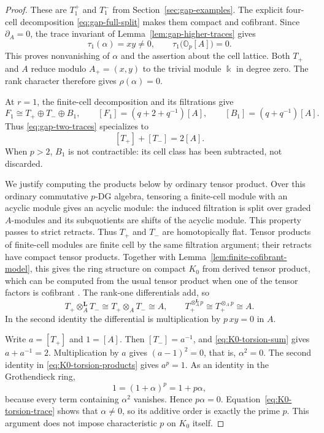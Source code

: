 \documentclass[11pt]{article}
\theoremstyle{definition}
\numberwithin{equation}{section}
\newcommand{\kk}{\Bbbk}
\begin{document}
\begin{proof}
These are $T_1^+$ and $T_1^-$ from
Section~\ref{sec:gap-examples}.  The explicit four-cell decomposition
\eqref{eq:gap-full-split} makes them compact and cofibrant.  Since
$\partial_A=0$, the trace invariant of
Lemma~\ref{lem:gap-higher-traces} gives
\begin{equation}\label{eq:K0-torsion-trace}
 \tau_1(\alpha)=xy\ne0,\qquad
 \tau_1\bigl(\mathbb O_p[A]\bigr)=0.
\end{equation}
This proves nonvanishing of $\alpha$ and the assertion about the cell
lattice.  Both $T_+$ and $A$ reduce modulo
$A_+=(x,y)$ to the trivial module $\kk$ in degree zero.
The rank character therefore gives $\rho(\alpha)=0$.

At $r=1$, the finite-cell decomposition and its filtrations give
\[
 F_1\cong T_+\oplus T_-\oplus B_1,\qquad
 [F_1]=(q+2+q^{-1})[A],\qquad [B_1]=(q+q^{-1})[A].
\]
Thus \eqref{eq:gap-two-traces} specializes to
\begin{equation}\label{eq:K0-torsion-sum}
 [T_+]+[T_-]=2[A].
\end{equation}
When $p>2$, $B_1$ is not contractible: its cell class has been
subtracted, not discarded.

We justify computing the products below by ordinary tensor product.
Over this ordinary commutative $p$-DG algebra, tensoring a finite-cell
module with an acyclic module gives an acyclic module: the induced
filtration is split over graded $A$-modules and its subquotients are
shifts of the acyclic module.  This property passes to strict
retracts.  Thus $T_+$ and $T_-$ are homotopically flat.
Tensor products of finite-cell modules are finite cell by the same
filtration argument; their retracts have compact tensor products.
Together with Lemma~\ref{lem:finite-cofibrant-model}, this gives the
ring structure on compact $K_0$ from derived tensor product, which can be 
computed from the usual tensor product when one of the tensor factors is cofibrant
\cite[Section~8.2]{QYHopf}. 
The rank-one differentials add, so
\begin{equation}\label{eq:K0-torsion-products}
 T_+\otimes_A^{\mathbf L}T_-\cong T_+\otimes_AT_-\cong A,\qquad
 T_+^{\otimes_A^{\mathbf L}p}\cong  T_+^{\otimes_Ap}\cong A.
\end{equation}
In the second identity the differential is multiplication by
$p\,xy=0$ in $A$.

Write $a=[T_+]$ and $1=[A]$.  Then $[T_-]=a^{-1}$, and
\eqref{eq:K0-torsion-sum} gives $a+a^{-1}=2$.
Multiplication by $a$ gives $(a-1)^2=0$, that is, $\alpha^2=0$.
The second identity in \eqref{eq:K0-torsion-products} gives $a^p=1$.
As an identity in the Grothendieck ring,
\[
 1=(1+\alpha)^p=1+p\alpha,
\]
because every term containing $\alpha^2$ vanishes.  Hence
$p\alpha=0$.  Equation~\eqref{eq:K0-torsion-trace} shows that
$\alpha\ne0$, so its additive order is exactly the prime $p$.
This argument does not impose characteristic $p$ on $K_0$ itself.


\end{proof}
\end{document}
